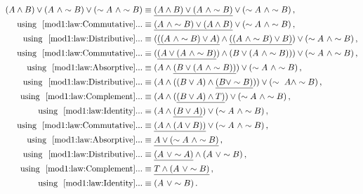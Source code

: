 \begin{subquestions}
\begin{align}
	(A \land B) \lor (A ~\land \sim B) \lor (\sim A ~\land \sim B) 
	& \equiv \underline{(A \land B) \lor (A ~\land \sim B)} \lor (\sim A ~\land \sim B)\,, \nonumber \\
	\text{using ~\ref{mod1:law:Commutative}}...
	& \equiv \underline{(A ~\land \sim B) \lor (A \land B)} \lor (\sim A ~\land \sim B)\,, \nonumber \\
	\text{using ~\ref{mod1:law:Distributive}}...
	& \equiv (\underline{((A ~\land \sim B) \lor A)} \land \underline{((A ~\land \sim B) \lor B)}) \lor (\sim A ~\land \sim B)\,, \nonumber \\
	\text{using ~\ref{mod1:law:Commutative}}...
	& \equiv (\underline{(A \lor (A ~\land \sim B)}) \land (B \lor (A ~\land \sim B))) \lor (\sim A ~\land \sim B)\,, \nonumber \\
	\text{using ~\ref{mod1:law:Absorptive}}...	
	& \equiv (A \land \underline{(B \lor (A ~\land \sim B))}) \lor (\sim A ~\land \sim B)\,, \nonumber \\
	\text{using ~\ref{mod1:law:Distributive}}...
	& \equiv (A \land ((B \lor A) \land \underline{(B \lor \sim B)})) \lor (\sim ~A \land \sim B)\,, \nonumber \\	
	\text{using ~\ref{mod1:law:Complement}}...	
	& \equiv (A \land (\underline{(B \lor A) \land T)}) \lor (\sim A ~\land \sim B)\,, \nonumber \\
	\text{using ~\ref{mod1:law:Identity}}...	
	& \equiv (A \land \underline{(B \lor A)}) \lor (\sim A ~\land \sim B)\,, \nonumber \\		
	\text{using ~\ref{mod1:law:Commutative}}...	
	& \equiv \underline{(A \land (A \lor B))} \lor (\sim A ~\land \sim B)\,, \nonumber \\
	\text{using ~\ref{mod1:law:Absorptive}}...
	& \equiv \underline{A \lor (\sim A ~\land \sim B)}\,, \nonumber \\	
	\text{using ~\ref{mod1:law:Distributive}}...
	& \equiv \underline{(A ~\lor \sim A)} \land (A ~\lor \sim B)\,, \nonumber \\
	\text{using ~\ref{mod1:law:Complement}}...	
	& \equiv \underline{T \land (A ~\lor \sim B)}\,, \nonumber \\	
	\text{using ~\ref{mod1:law:Identity}}...	
	& \equiv (A ~\lor \sim B)\,.	
\end{align}
	
\end{subquestions}